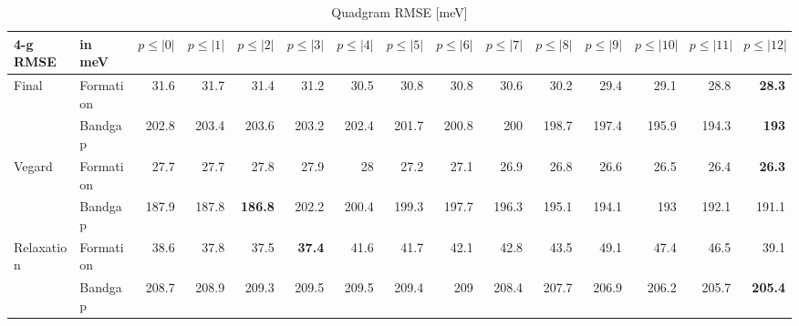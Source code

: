 \documentclass[11pt,oneside,czech,american]{book} %
\theoremstyle{definition} %
\theoremstyle{definition}
\begin{document}
\begin{table}[H]
	\scriptsize
	\centering
\begin{tabular}{llrrrrrrrrrrrrr}
	\hline
	4-g RMSE   & in meV    &   $p{\leq}|0|$ &   $p{\leq}|1|$ &   $p{\leq}|2|$ &   $p{\leq}|3|$ &   $p{\leq}|4|$ &   $p{\leq}|5|$ &   $p{\leq}|6|$ &   $p{\leq}|7|$ &   $p{\leq}|8|$ &   $p{\leq}|9|$ &   $p{\leq}|10|$ &   $p{\leq}|11|$ &   $p{\leq}|12|$ \\
	\hline
	\multirow{2}{*}{Final}      & Formation &       31.6 &       31.7 &       31.4 &       31.2 &       30.5 &       30.8 &       30.8 &       30.6 &       30.2 &       29.4 &        29.1 &        28.8 &        \textbf{28.3}\\
	      & Bandgap   &      202.8 &      203.4 &      203.6 &      203.2 &      202.4 &      201.7 &      200.8 &      200   &      198.7 &      197.4 &       195.9 &       194.3 &       \textbf{193}\\
	\multirow{2}{*}{Vegard}     & Formation &       27.7 &       27.7 &       27.8 &       27.9 &       28   &       27.2 &       27.1 &       26.9 &       26.8 &       26.6 &        26.5 &        26.4 &        \textbf{26.3}\\
	    & Bandgap   &      187.9 &      187.8 &      \textbf{186.8} &      202.2 &      200.4 &      199.3 &      197.7 &      196.3 &      195.1 &      194.1 &       193   &       192.1 &       191.1\\
	\multirow{2}{*}{Relaxation} & Formation &       38.6 &       37.8 &       37.5 &       \textbf{37.4} &       41.6 &       41.7 &       42.1 &       42.8 &       43.5 &       49.1 &        47.4 &        46.5 &        39.1\\
	 & Bandgap   &      208.7 &      208.9 &      209.3 &      209.5 &      209.5 &      209.4 &      209   &      208.4 &      207.7 &      206.9 &       206.2 &       205.7 &       \textbf{205.4}\\
	\hline
\end{tabular}
	\caption{Quadgram RMSE [meV]}
	\label{4-g RMSE}
\end{table}
\end{document}
